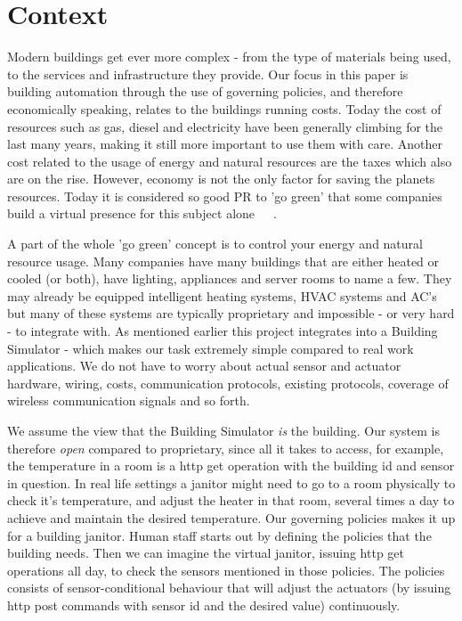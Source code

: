 \section{Context} \label{sec:context}
Modern buildings get ever more complex - from the type of materials being used, to the services and infrastructure they provide. Our focus in this paper is building automation through the use of governing policies, and therefore economically speaking, relates to the buildings running costs. Today the cost of resources such as gas, diesel and electricity have been generally climbing for the last many years, making it still more important to use them with care. Another cost related to the usage of energy and natural resources are the taxes which also are on the rise. However, economy is not the only factor for saving the planets resources. Today it is considered so good PR to 'go green' that some companies build a virtual presence for this subject alone~\cite{green-google}~\cite{green-facebook}~\cite{green-microsoft}.

A part of the whole 'go green' concept is to control your energy and natural resource usage. Many companies have many buildings that are either heated or cooled (or both), have lighting, appliances and server rooms to name a few. They may already be equipped intelligent heating systems, HVAC systems and AC's but many of these systems are typically proprietary and impossible - or very hard - to integrate with. As mentioned earlier this project integrates into a Building Simulator - which makes our task extremely simple compared to real work applications. We do not have to worry about actual sensor and actuator hardware, wiring, costs, communication protocols, existing protocols, coverage of wireless communication signals and so forth.

We assume the view that the Building Simulator \textit{is} the building. Our system is therefore \textit{open} compared to proprietary, since all it takes to access, for example, the temperature in a room is a http get operation with the building id and sensor in question. In real life settings a janitor might need to go to a room physically to check it's temperature, and adjust the heater in that room, several times a day to achieve and maintain the desired temperature. Our governing policies makes it up for a building janitor. Human staff starts out by defining the policies that the building needs. Then we can imagine the virtual janitor, issuing http get operations all day, to check the sensors mentioned in those policies. The policies consists of sensor-conditional behaviour that will adjust the actuators (by issuing http post commands with sensor id and the desired value) continuously.

